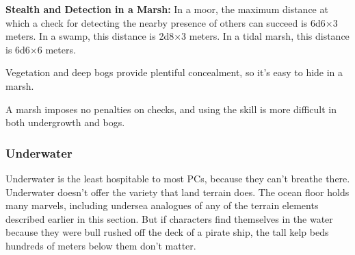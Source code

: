 \textbf{Stealth and Detection in a Marsh:} In a moor, the maximum distance at which a  check for detecting the nearby presence of others can succeed is 6d6$\times$3 meters. In a swamp, this distance is 2d8$\times$3 meters. In a tidal marsh, this distance is 6d6$\times$6 meters.

Vegetation and deep bogs provide plentiful concealment, so it's easy to hide in a marsh.

A marsh imposes no penalties on  checks, and using the  skill is more difficult in both undergrowth and bogs.


\subsubsection{Underwater}
Underwater is the least hospitable to most PCs, because they can't breathe there. Underwater doesn't offer the variety that land terrain does. The ocean floor holds many marvels, including undersea analogues of any of the terrain elements described earlier in this section. But if characters find themselves in the water because they were bull rushed off the deck of a pirate ship, the tall kelp beds hundreds of meters below them don't matter. %




